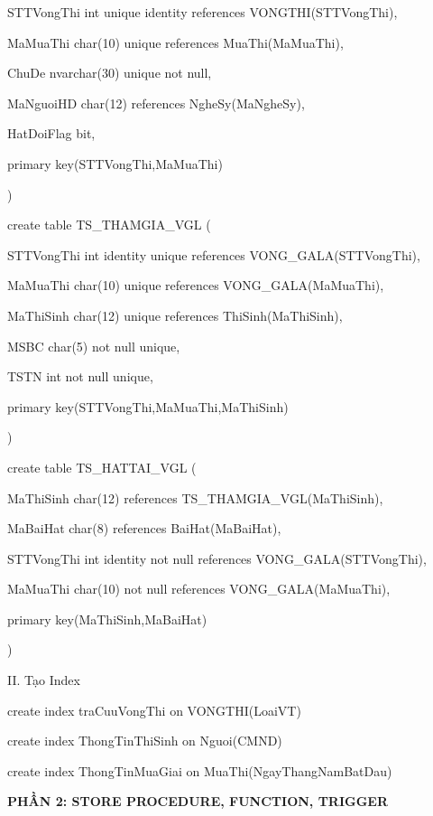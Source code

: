 \documentclass{report}
\begin{document}
	\setlength{\parindent}{1.5cm}
	STTVongThi int unique identity references VONGTHI(STTVongThi),
	
	MaMuaThi char(10) unique references MuaThi(MaMuaThi),
	
	ChuDe nvarchar(30) unique not null,
	
	MaNguoiHD char(12) references NgheSy(MaNgheSy),
	
	HatDoiFlag bit,
	
	primary key(STTVongThi,MaMuaThi)
	
	\setlength{\parindent}{0.5cm}
)

\bigskip

create table TS\_THAMGIA\_VGL (

	\setlength{\parindent}{1.5cm}
	STTVongThi int identity unique references VONG\_GALA(STTVongThi),
	
	MaMuaThi char(10) unique references VONG\_GALA(MaMuaThi),
	
	MaThiSinh char(12) unique references ThiSinh(MaThiSinh),
	
	MSBC char(5) not null unique,
	
	TSTN int not null unique,
	
	primary key(STTVongThi,MaMuaThi,MaThiSinh)
	
	\setlength{\parindent}{0.5cm}
)

\bigskip

create table TS\_HATTAI\_VGL (

	\setlength{\parindent}{1.5cm}
	MaThiSinh char(12) references TS\_THAMGIA\_VGL(MaThiSinh),
	
	MaBaiHat char(8) references BaiHat(MaBaiHat),
	
	STTVongThi int identity not null references VONG\_GALA(STTVongThi),
	
	MaMuaThi char(10) not null references VONG\_GALA(MaMuaThi),
	
	primary key(MaThiSinh,MaBaiHat)
	
	\setlength{\parindent}{0.5cm}
)

\bigskip
\setlength{\parindent}{0cm}
II. Tạo Index

\setlength{\parindent}{0.5cm}
create index traCuuVongThi on VONGTHI(LoaiVT) 

create index ThongTinThiSinh on Nguoi(CMND)

create index ThongTinMuaGiai on MuaThi(NgayThangNamBatDau)

\bigskip

\newpage
\changefontsizes{16pt}
\centerline{\textbf{PHẦN 2: STORE PROCEDURE, FUNCTION, TRIGGER}}
\end{document}
